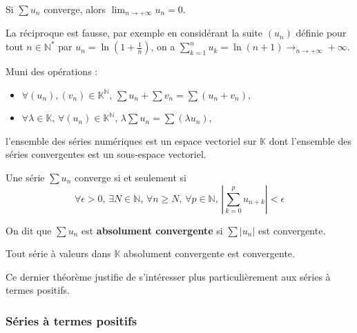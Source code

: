 
  \begin{proposition}
    Si $\sum u_n$ converge, alors $\lim_{n \rightarrow +\infty} u_n = 0$.
  \end{proposition}

  \begin{cexample}
    La réciproque est fausse, par exemple en considérant la suite $(u_n)$ définie pour tout $n \in \mathbb{N}^*$ par $u_n = \ln(1 + \frac{1}{n})$, on a $\sum_{k=1}^{n} u_k = \ln(n+1) \longrightarrow_{n \rightarrow +\infty} +\infty$.
  \end{cexample}

  \begin{proposition}
    Muni des opérations :
    \begin{itemize}
      \item $\forall (u_n), (v_n) \in \mathbb{K}^{\mathbb{N}}, \, \sum u_n + \sum v_n = \sum (u_n + v_n)$,
      \item $\forall \lambda \in \mathbb{K}, \, \forall (u_n) \in \mathbb{K}^{\mathbb{N}}, \, \lambda \sum u_n = \sum (\lambda u_n)$,
    \end{itemize}
    l'ensemble des séries numériques est un espace vectoriel sur $\mathbb{K}$ dont l'ensemble des séries convergentes est un sous-espace vectoriel.
  \end{proposition}


  \begin{proposition}
    Une série $\sum u_n$ converge si et seulement si
    \[ \forall \epsilon > 0, \, \exists N \in \mathbb{N}, \, \forall n \geq N, \, \forall p \in \mathbb{N}, \, \left| \sum_{k=0}^{p} u_{n+k} \right| < \epsilon \]
  \end{proposition}

  \begin{definition}
    On dit que $\sum u_n$ est \textbf{absolument convergente} si $\sum |u_n|$ est convergente.
  \end{definition}

  \begin{theorem}
    Tout série à valeurs dans $\mathbb{K}$ absolument convergente est convergente.
  \end{theorem}

  Ce dernier théorème justifie de s'intéresser plus particulièrement aux séries à termes positifs.

  \subsubsection{Séries à termes positifs}

